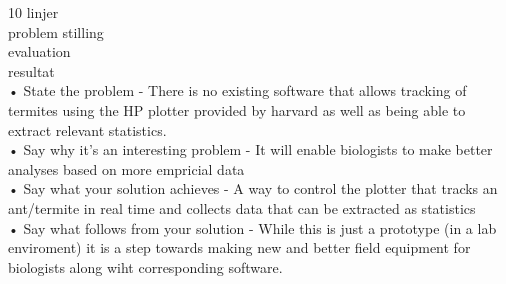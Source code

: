 
10 linjer \\
problem stilling \\
evaluation \\
resultat \\

• State the problem - There is no existing software that allows tracking of termites using the HP plotter provided by harvard as well as being able to extract relevant statistics.\\
• Say why it’s an interesting problem - It will enable biologists to make better analyses based on more empricial data \\
• Say what your solution achieves - A way to control the plotter that tracks an ant/termite in real time and collects data that can be extracted as statistics\\
• Say what follows from your solution - While this is just a prototype (in a lab enviroment) it is a step towards making new and better field equipment for biologists along wiht corresponding software.\\
